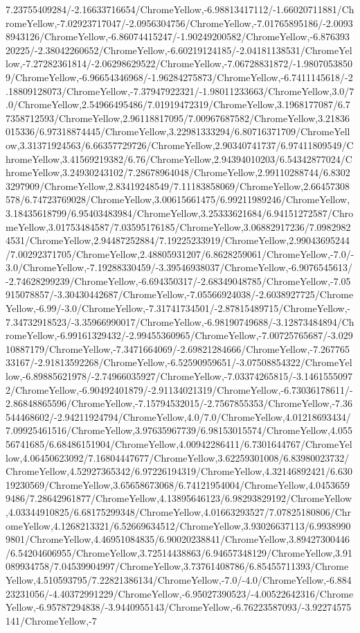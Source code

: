{\begin{tikzternal}
7.23755409284/-2.16633716654/ChromeYellow,-6.98813417112/-1.66020711881/ChromeYellow,-7.02923717047/-2.0956304756/ChromeYellow,-7.01765895186/-2.00938943126/ChromeYellow,-6.86074415247/-1.90249200582/ChromeYellow,-6.87639320225/-2.38042260652/ChromeYellow,-6.60219124185/-2.04181138531/ChromeYellow,-7.27282361814/-2.06298629522/ChromeYellow,-7.06728831872/-1.98070538509/ChromeYellow,-6.96654346968/-1.96284275873/ChromeYellow,-6.7411145618/-2.18809128073/ChromeYellow,-7.37947922321/-1.98011233663/ChromeYellow,3.0/7.0/ChromeYellow,2.54966495486/7.01919472319/ChromeYellow,3.1968177087/6.77358712593/ChromeYellow,2.96118817095/7.00967687582/ChromeYellow,3.21836015336/6.97318874445/ChromeYellow,3.22981333294/6.80716371709/ChromeYellow,3.31371924563/6.66357729726/ChromeYellow,2.90340741737/6.97411809549/ChromeYellow,3.41569219382/6.76/ChromeYellow,2.94394010203/6.54342877024/ChromeYellow,3.24930243102/7.28678964048/ChromeYellow,2.99110288744/6.83023297909/ChromeYellow,2.83419248549/7.11183858069/ChromeYellow,2.66457308578/6.74723769028/ChromeYellow,3.00615661475/6.99211989246/ChromeYellow,3.18435618799/6.95403483984/ChromeYellow,3.25333621684/6.94151272587/ChromeYellow,3.01753484587/7.03595176185/ChromeYellow,3.06882917236/7.09829824531/ChromeYellow,2.94487252884/7.19225233919/ChromeYellow,2.99043695244/7.00292371705/ChromeYellow,2.48805931207/6.8628259061/ChromeYellow,-7.0/-3.0/ChromeYellow,-7.19288330459/-3.39546938037/ChromeYellow,-6.9076545613/-2.74628299239/ChromeYellow,-6.694350317/-2.68349048785/ChromeYellow,-7.05915078857/-3.30430442687/ChromeYellow,-7.05566924038/-2.6038927725/ChromeYellow,-6.99/-3.0/ChromeYellow,-7.31741734501/-2.87815489715/ChromeYellow,-7.34732918523/-3.35966990017/ChromeYellow,-6.98190749688/-3.12873484894/ChromeYellow,-6.99161329432/-2.99455360965/ChromeYellow,-7.00725765687/-3.02910887179/ChromeYellow,-7.3471664069/-2.69821284666/ChromeYellow,-7.26776533167/-2.91813592268/ChromeYellow,-6.52590959651/-3.07508854322/ChromeYellow,-6.89885621978/-2.74966035927/ChromeYellow,-7.03374265815/-3.14615550972/ChromeYellow,-6.90492401879/-2.91134021319/ChromeYellow,-6.73036178611/-2.86848865596/ChromeYellow,-7.15794532015/-2.7567855353/ChromeYellow,-7.36544468602/-2.94211924794/ChromeYellow,4.0/7.0/ChromeYellow,4.01218693434/7.09925461516/ChromeYellow,3.97635967739/6.98153015574/ChromeYellow,4.05556741685/6.68486151904/ChromeYellow,4.00942286411/6.7301644767/ChromeYellow,4.06450623092/7.16804447677/ChromeYellow,3.62259301008/6.83980023732/ChromeYellow,4.52927365342/6.97226194319/ChromeYellow,4.32146892421/6.63019230569/ChromeYellow,3.65658673068/6.74121954004/ChromeYellow,4.04536599486/7.28642961877/ChromeYellow,4.13895646123/6.98293829192/ChromeYellow,4.03344910825/6.68175299348/ChromeYellow,4.01663293527/7.07825180806/ChromeYellow,4.1268213321/6.52669634512/ChromeYellow,3.93026637113/6.99389909801/ChromeYellow,4.46951084835/6.90020238841/ChromeYellow,3.89427300446/6.54204606955/ChromeYellow,3.72514438863/6.94657348129/ChromeYellow,3.91089934758/7.04539904997/ChromeYellow,3.73761408786/6.85455711393/ChromeYellow,4.510593795/7.22821386134/ChromeYellow,-7.0/-4.0/ChromeYellow,-6.88423231056/-4.40372991229/ChromeYellow,-6.95027390523/-4.00522642316/ChromeYellow,-6.95787294838/-3.9440955143/ChromeYellow,-6.76223587093/-3.92274575141/ChromeYellow,-7
\end{tikzternal}}
